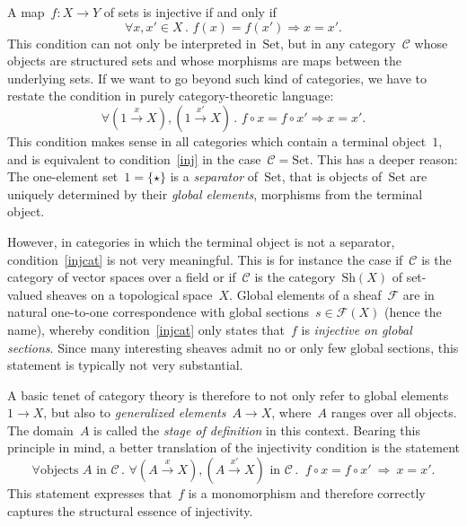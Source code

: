 \documentclass[10pt,reqno,a4paper]{amsbook}
\theoremstyle{definition}
\theoremstyle{plain}
\theoremstyle{remark}
\renewcommand{\C}{\mathcal{C}}
\newcommand{\F}{\mathcal{F}}
\newcommand{\Set}{\mathrm{Set}}
\newcommand{\Sh}{\mathrm{Sh}}
\newcommand{\?}{\,{:}\,}
\renewcommand{\_}{\mathpunct{.}\,}
\newcommand{\xra}{\xrightarrow}
\begin{document}
A map~$f : X \to Y$ of sets is injective if and only if
\begin{equation}\label{inj}
  \forall x,x' \in X\_ f(x) = f(x') \Longrightarrow x = x'.
\end{equation}
This condition can not only be interpreted in~$\Set$, but in any category~$\C$ whose
objects are structured sets and whose morphisms are maps between the underlying
sets. If we want to go beyond such kind of categories, we have to restate the
condition in purely category-theoretic language:
\begin{equation}\label{injcat}
  \forall (1 \xra{x} X), (1 \xra{x'} X)\_ f \circ x = f \circ x'
  \Longrightarrow x = x'.
\end{equation}
This condition makes sense in all categories which contain a terminal
object~$1$, and is equivalent to condition~\eqref{inj} in the case~$\C = \Set$.
This has a deeper reason: The one-element set~$1 = \{ \star \}$ is a
\emph{separator} of~$\Set$, that is objects of~$\Set$ are uniquely determined
by their \emph{global elements}, morphisms from the terminal object.

However, in categories in which the terminal object is not a separator,
condition~\eqref{injcat} is not very meaningful. This is for instance the case
if~$\C$ is the category of vector spaces over a field or if~$\C$ is the category~$\Sh(X)$ of set-valued sheaves on a topological
space~$X$. Global elements of a sheaf~$\F$ are in natural one-to-one
correspondence with global sections~$s \in \F(X)$ (hence the name), whereby
condition~\eqref{injcat} only states that~$f$ is \emph{injective on global
sections}. Since many interesting sheaves admit no or only few global sections,
this statement is typically not very substantial.

A basic tenet of category theory is therefore to not only refer to global
elements~$1 \to X$, but also to \emph{generalized elements}~$A \to X$,
where~$A$ ranges over all objects. The domain~$A$ is called the \emph{stage of
definition} in this context. Bearing this principle in mind, a better
translation of the injectivity condition is the statement
\begin{equation}\label{injgen}
  \forall \text{objects $A$ in~$\C$}\_ \forall (A \xra{x} X), (A \xra{x'\!} X) \text{ in~$\C$}\_\
  f \circ x = f \circ x' \ \Longrightarrow\ x = x'.
\end{equation}
This statement expresses that~$f$ is a monomorphism and therefore
correctly captures the structural essence of injectivity.
\end{document}
